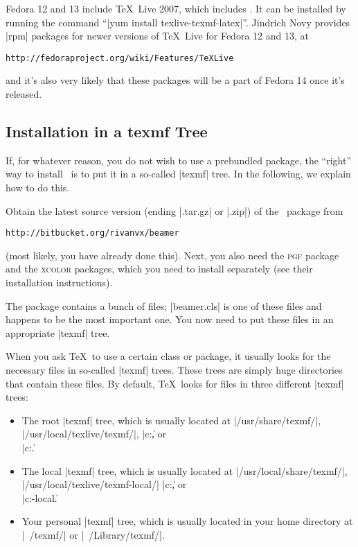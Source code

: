 Fedora 12 and 13 include \TeX\ Live 2007, which includes \beamer. It can be installed by running the command ``|yum install texlive-texmf-latex|''. Jindrich Novy provides |rpm| packages for newer versions of \TeX\ Live for Fedora 12 and 13, at
\begin{verbatim}
http://fedoraproject.org/wiki/Features/TeXLive
\end{verbatim}

and it's also very likely that these packages will be a part of Fedora 14 once it's released.


\subsection{Installation in a texmf Tree}

If, for whatever reason, you do not wish to use a prebundled package, the ``right'' way to install \beamer\ is to put it in a so-called |texmf| tree. In the following, we explain how to do this.

Obtain the latest source version (ending |.tar.gz| or |.zip|) of the \beamer\ package from
\begin{verbatim}
http://bitbucket.org/rivanvx/beamer
\end{verbatim}

(most likely, you have already done this). Next, you also need the \textsc{pgf} package and the \textsc{xcolor} packages, which you need to install separately (see their installation instructions).

The package contains a bunch of files; |beamer.cls| is one of these files and happens to be the most important one. You now need to put these files in an appropriate |texmf| tree.

When you ask \TeX\ to use a certain class or package, it usually looks for the necessary files in so-called |texmf| trees. These trees are simply huge directories that contain these files. By default, \TeX\ looks for files in three different |texmf| trees:
\begin{itemize}
\item
  The root |texmf| tree, which is usually located at |/usr/share/texmf/|, |/usr/local/texlive/texmf/|, |c:\texmf\|, or\\ |c:\texlive\texmf\|.
\item
  The local  |texmf| tree, which is usually located at |/usr/local/share/texmf/|, |/usr/local/texlive/texmf-local/| |c:\localtexmf\|, or\\ |c:\texlive\texmf-local\|.
\item
  Your personal |texmf| tree, which is usually located in your home directory at |~/texmf/| or |~/Library/texmf/|.
\end{itemize}

